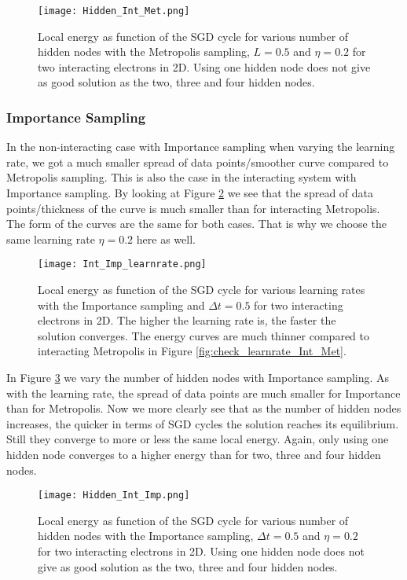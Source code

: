 \documentclass[12pt,a4paper,english]{article}
\begin{document}
\begin{figure}[htbp!]
	\centering\texttt{[image: Hidden\_Int\_Met.png]}
	\caption{Local energy as function of the SGD cycle for various number of hidden nodes with the Metropolis sampling, $L=0.5$ and $\eta=0.2$ for two interacting electrons in 2D. Using one hidden node does not give as good solution as the two, three and four hidden nodes. \label{fig:check_hidden_Int_Met}}
\end{figure} 

\subsubsection{Importance Sampling}
\label{subsubsect:Results_int_Importance}
In the non-interacting case with Importance sampling when varying the learning rate, we got a much smaller spread of data points/smoother curve compared to Metropolis sampling. This is also the case in the interacting system with Importance sampling. By looking at Figure \ref{fig:check_learnrate_Int_Imp} we see that the spread of data points/thickness of the curve is much smaller than for interacting Metropolis. The form of the curves are the same for both cases. That is why we choose the same learning rate $\eta=0.2$ here as well.

\begin{figure}[htbp!]
	\centering\texttt{[image: Int\_Imp\_learnrate.png]}
	\caption{Local energy as function of the SGD cycle for various learning rates with the Importance sampling and $\Delta t=0.5$ for two interacting electrons in 2D. The higher the learning rate is, the faster the solution converges. The energy curves are much thinner compared to interacting Metropolis in Figure \ref{fig:check_learnrate_Int_Met}. \label{fig:check_learnrate_Int_Imp}}
\end{figure} 

In Figure \ref{fig:check_hidden_Int_Imp} we vary the number of hidden nodes with Importance sampling. As with the learning rate, the spread of data points are much smaller for Importance than for Metropolis. Now we more clearly see that as the number of hidden nodes increases, the quicker in terms of SGD cycles the solution reaches its equilibrium. Still they converge to more or less the same local energy. Again, only using one hidden node converges to a higher energy than for two, three and four hidden nodes.

\begin{figure}[htbp!]
	\centering\texttt{[image: Hidden\_Int\_Imp.png]}
	\caption{Local energy as function of the SGD cycle for various number of hidden nodes with the Importance sampling, $\Delta t=0.5$ and $\eta=0.2$ for two interacting electrons in 2D. Using one hidden node does not give as good solution as the two, three and four hidden nodes. \label{fig:check_hidden_Int_Imp}}
\end{figure} 
\end{document}
